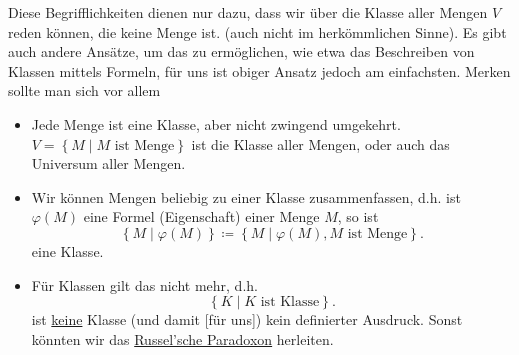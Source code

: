 \begin{remark*}
    Diese Begrifflichkeiten dienen nur dazu, dass wir über die Klasse aller Mengen $V$ reden können, die keine Menge ist. (auch nicht im herkömmlichen Sinne). Es gibt auch andere Ansätze, um das zu ermöglichen, wie etwa das Beschreiben von Klassen mittels Formeln, für uns ist obiger Ansatz jedoch am einfachsten. Merken sollte man sich vor allem
    \begin{itemize}
        \item Jede Menge ist eine Klasse, aber nicht zwingend umgekehrt. $V = \left \{M \mid  M \text{ ist Menge}\right\} $ ist die Klasse aller Mengen, oder auch das Universum aller Mengen.
        \item Wir können Mengen beliebig zu einer Klasse zusammenfassen, d.h. ist $\varphi (M)$ eine Formel (Eigenschaft) einer Menge $M$, so ist
             \[
                 \left \{M \mid  \varphi (M)\right\} \coloneqq  \left \{M  \mid  \varphi (M) , M \text{ ist Menge}\right\} 
            .\] 
            eine Klasse.
        \item Für Klassen gilt das nicht mehr, d.h. 
            \[
            \left \{K \mid K \text{ ist Klasse}\right\} 
            .\] 
            ist \underline{keine} Klasse (und damit [für uns]) kein definierter Ausdruck. Sonst könnten wir das \href{https://en.wikipedia.org/wiki/Russell%27s_paradox}{Russel'sche Paradoxon} herleiten.
    \end{itemize}
\end{remark*}

